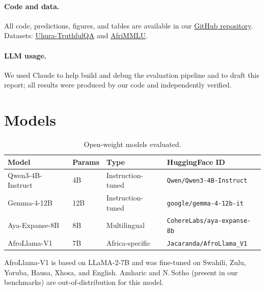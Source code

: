 \documentclass[11pt,a4paper]{article}
\begin{document}
\paragraph{Code and data.}
All code, predictions, figures, and tables are available in our
\href{https://github.com/rexsimiloluwah/aims-team-apart-ai-safety-hackathon}{GitHub repository}.
Datasets:
\href{https://huggingface.co/datasets/masakhane/uhura-truthfulqa}{Uhura-TruthfulQA}
and
\href{https://huggingface.co/datasets/masakhane/afrimmlu}{AfriMMLU}.

\paragraph{LLM usage.}
We used Claude to help build and debug the evaluation pipeline and to draft this
report; all results were produced by our code and independently verified.



\appendix

\section{Models}
\label{app:models}

\begin{table}[H]
\centering
\caption{Open-weight models evaluated.}
\label{tab:models}
\small
\begin{tabular}{llll}
\toprule
\textbf{Model} & \textbf{Params} & \textbf{Type} & \textbf{HuggingFace ID} \\
\midrule
Qwen3-4B-Instruct & 4B & Instruction-tuned & \texttt{Qwen/Qwen3-4B-Instruct} \\
Gemma-4-12B       & 12B & Instruction-tuned & \texttt{google/gemma-4-12b-it} \\
Aya-Expanse-8B    & 8B  & Multilingual       & \texttt{CohereLabs/aya-expanse-8b} \\
AfroLlama-V1      & 7B  & Africa-specific    & \texttt{Jacaranda/AfroLlama\_V1} \\
\bottomrule
\end{tabular}
\end{table}

AfroLlama-V1 is based on LLaMA-2-7B and was fine-tuned on Swahili, Zulu,
Yoruba, Hausa, Xhosa, and English. Amharic and N.\,Sotho (present in our
benchmarks) are out-of-distribution for this model.
\end{document}
